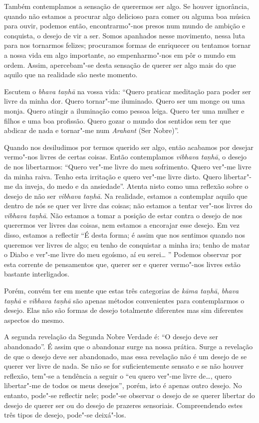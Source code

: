 Também contemplamos a sensação de querermos ser algo. Se houver ignorância,
quando não estamos a procurar algo delicioso para comer ou alguma boa música
para ouvir, podemos então, encontrarmo"-nos presos num mundo de ambição e
conquista, o desejo de vir a ser. Somos apanhados nesse movimento, nessa luta
para nos tornarmos felizes; procuramos formas de enriquecer ou tentamos tornar a
nossa vida em algo importante, ao empenharmo"-nos em pôr o mundo em ordem. Assim,
apercebam"-se desta sensação de querer ser algo mais do que aquilo que na
realidade são neste momento.

Escutem o \emph{bhava taṇhā} na vossa vida: “Quero praticar meditação para poder
ser livre da minha dor. Quero tornar"-me iluminado. Quero ser um monge ou uma
monja. Quero atingir a iluminação como pessoa leiga. Quero ter uma mulher e
filhos e uma boa profissão. Quero gozar o mundo dos sentidos sem ter que abdicar
de nada e tornar"-me num \emph{Arahant} (Ser Nobre)”.

Quando nos desiludimos por termos querido ser algo, então acabamos por desejar
vermo"-nos livres de certas coisas. Então contemplamos \emph{vibhava taṇhā}, o
desejo de nos libertarmos: “Quero ver"-me livre do meu sofrimento. Quero ver"-me
livre da minha raiva. Tenho esta irritação e quero ver"-me livre disto. Quero
libertar"-me da inveja, do medo e da ansiedade”. Atenta nisto como uma reflexão
sobre o desejo de não ser \emph{vibhava taṇhā}. Na realidade, estamos a
contemplar aquilo que dentro de nós se quer ver livre das coisas; não estamos a
tentar ver"-nos livres do \emph{vibhava taṇhā}. Não estamos a tomar a posição de
estar contra o desejo de nos querermos ver livres das coisas, nem estamos a
encorajar esse desejo. Em vez disso, estamos a reflectir “É desta forma; é assim
que nos sentimos quando nos queremos ver livres de algo; eu tenho de conquistar
a minha ira; tenho de matar o Diabo e ver"-me livre do meu egoísmo, aí eu
serei\ldots{} ” Podemos observar por esta corrente de pensamentos que, querer ser e
querer vermo"-nos livres estão bastante interligados.

Porém, convém ter em mente que estas três categorias de \emph{kāma taṇhā},
\emph{bhava taṇhā} e \emph{vibhava taṇhā} são apenas métodos convenientes para
contemplarmos o desejo. Elas não são formas de desejo totalmente diferentes mas
sim diferentes aspectos do mesmo.

A segunda revelação da Segunda Nobre Verdade é: “O desejo deve ser abandonado”.
É assim que o abandonar surge na nossa prática. Surge a revelação de que o
desejo deve ser abandonado, mas essa revelação não é um desejo de se querer ver
livre de nada. Se não se for suficientemente sensato e se não houver reflexão,
tem"-se a tendência a seguir o “eu quero ver"-me livre de\ldots{}, quero
libertar"-me de todos os meus desejos”, porém, isto é apenas outro desejo. No
entanto, pode"-se reflectir nele; pode"-se observar o desejo de se querer libertar
do desejo de querer ser ou do desejo de prazeres sensoriais. Compreendendo estes
três tipos de desejo, pode"-se deixá"-los.

